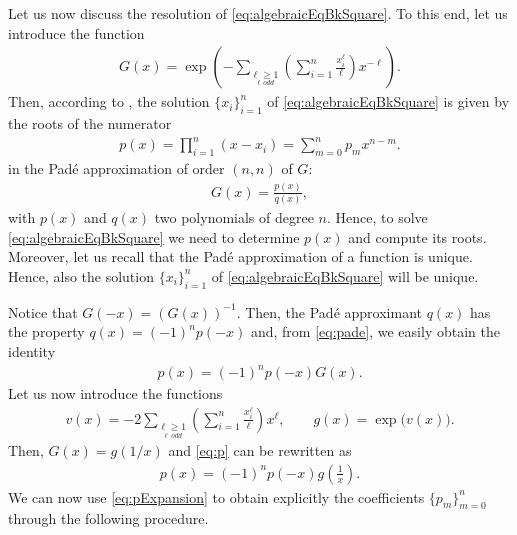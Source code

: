 \documentclass[a4paper]{article}
\numberwithin{equation}{section}
\begin{document}
{Let us now discuss the resolution of \eqref{eq:algebraicEqBkSquare}. To this end, let us introduce the function
\begin{align}\label{eq:FunctionG}
	G(x) = \exp\left(-\sum_{\underset{\ell\,odd}{\ell\geq 1}}\left(\sum_{i=1}^n \frac{x_i^\ell}{\ell}\right)x^{-\ell}\right).
\end{align}
Then, according to \cite[Theorem 1]{chudnovsky1999solution}, the solution $\{x_i\}_{i=1}^n$ of \eqref{eq:algebraicEqBkSquare} is given by the roots of the numerator 
\begin{align*}
	p(x) = \prod_{i=1}^n (x-x_i) = \sum_{m=0}^n p_mx^{n-m}.
\end{align*}
in the Pad\'e approximation of order $(n,n)$ of $G$:
\begin{align}\label{eq:pade}
	G(x) = \frac{p(x)}{q(x)},
\end{align}
with $p(x)$ and $q(x)$ two polynomials of degree $n$. Hence, to solve \eqref{eq:algebraicEqBkSquare} we need to determine $p(x)$ and compute its roots. Moreover, let us recall that the Pad\'e approximation of a function is unique. Hence, also the solution $\{x_i\}_{i=1}^n$ of \eqref{eq:algebraicEqBkSquare} will be unique.

Notice that $G(-x) = (G(x))^{-1}$. Then, the Pad\'e approximant $q(x)$ has the property $q(x) = (-1)^np(-x)$ and, from \eqref{eq:pade}, we easily obtain the identity
\begin{align}\label{eq:p}
	p(x) = (-1)^np(-x)G(x).
\end{align}
Let us now introduce the functions
\begin{align}\label{eq:vDef}
	v(x) = -2\sum_{\underset{\ell\; odd}{\ell\geq 1}}\left(\sum_{i=1}^n \frac{x_i^\ell}{\ell}\right) x^\ell, \quad\quad g(x) = \exp\big(v(x)\big).
\end{align}
Then, $G(x) = g(1/x)$ and \eqref{eq:p} can be rewritten as
\begin{align}\label{eq:pExpansion}
	p(x) = (-1)^np(-x)g\left(\frac 1x\right).
\end{align}
We can now use \eqref{eq:pExpansion} to obtain explicitly the coefficients $\{p_m\}_{m=0}^n$ through the following procedure.

}
\end{document}
